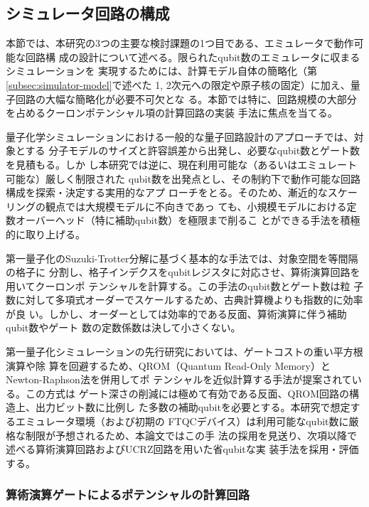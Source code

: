 \documentclass[wabun2025.tex]{subfiles}
\begin{document}
\subsection{シミュレータ回路の構成}
\label{sec:simulator-circuit-configuration}
本節では、本研究の3つの主要な検討課題の1つ目である、エミュレータで動作可能な回路構
成の設計について述べる。限られたqubit数のエミュレータに収まるシミュレーションを
実現するためには、計算モデル自体の簡略化（第\ref{subsec:simulator-model}で述べた
1, 2次元への限定や原子核の固定）に加え、量子回路の大幅な簡略化が必要不可欠とな
る。本節では特に、回路規模の大部分を占めるクーロンポテンシャル項の計算回路の実装
手法に焦点を当てる。

量子化学シミュレーションにおける一般的な量子回路設計のアプローチでは、対象とする
分子モデルのサイズと許容誤差から出発し、必要なqubit数とゲート数を見積もる。しか
し本研究では逆に、現在利用可能な（あるいはエミュレート可能な）厳しく制限された
qubit数を出発点とし、その制約下で動作可能な回路構成を探索・決定する実用的なアプ
ローチをとる。そのため、漸近的なスケーリングの観点では大規模モデルに不向きであっ
ても、小規模モデルにおける定数オーバーヘッド（特に補助qubit数）を極限まで削るこ
とができる手法を積極的に取り上げる。

第一量子化のSuzuki-Trotter分解に基づく基本的な手法では、対象空間を等間隔の格子に
分割し、格子インデクスをqubitレジスタに対応させ、算術演算回路を用いてクーロンポ
テンシャルを計算する\cite{Zalka-rspa.1998.0162}。この手法のqubit数とゲート数は粒
子数に対して多項式オーダーでスケールするため、古典計算機よりも指数的に効率が良
い。しかし、オーダーとしては効率的である反面、算術演算に伴う補助qubit数やゲート
数の定数係数は決して小さくない。

第一量子化シミュレーションの先行研究においては、ゲートコストの重い平方根演算や除
算を回避するため、QROM（Quantum Read-Only Memory）とNewton-Raphson法を併用してポ
テンシャルを近似計算する手法が提案されている\cite{Rubin2024.pnas.2317772121,
Babbush_2018b.PhysRevX.8.041015, Sanders2020.PRXQuantum.1.020312}。この方式は
ゲート深さの削減には極めて有効である反面、QROM回路の構造上、出力ビット数に比例し
た多数の補助qubitを必要とする。本研究で想定するエミュレータ環境（および初期の
FTQCデバイス）は利用可能なqubit数に厳格な制限が予想されるため、本論文ではこの手
法の採用を見送り、次項以降で述べる算術演算回路およびUCRZ回路を用いた省qubitな実
装手法を採用・評価する。

\subsubsection{算術演算ゲートによるポテンシャルの計算回路}
\label{subsec:potential-circuit-by-arithmetic-gates}
\end{document}
